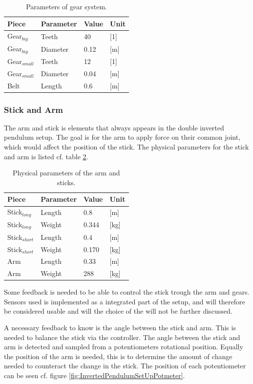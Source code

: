 \begin{table}[htbp]
\centering
\begin{tabular}{llll}
\hline
Piece & Parameter & Value & Unit \\ \hline
Gear$_{big}$ & Teeth & 40 & {[}1{]} \\
Gear$_{big}$ & Diameter & 0.12 & {[}m{]} \\
Gear$_{small}$ & Teeth & 12 & {[}1{]} \\
Gear$_{small}$ & Diameter & 0.04 & {[}m{]} \\
Belt & Length & 0.6 & {[}m{]}
\end{tabular}
\caption{Parameters of gear system.}
\label{GearSystemParameters}
\end{table}

\subsubsection{Stick and Arm}
The arm and stick is elements that always appears in the double inverted pendulum setup. The goal is for the arm to apply force on their common joint, which would affect the position of the stick. The physical parameters for the stick and arm is listed cf. table \ref{DimensionsStick}.

\begin{table}[htbp]
\centering
\begin{tabular}{llll}
\hline
Piece           & Parameter & Value & Unit \\ \hline
Stick$_{long}$  & Length    & 0.8   & [m]    \\
Stick$_{long}$  & Weight    & 0.344 & [kg]    \\ 
Stick$_{short}$ & Length    & 0.4   & [m]    \\
Stick$_{short}$ & Weight    & 0.170 & [kg]    \\ 
Arm             & Length    & 0.33  & [m]    \\
Arm             & Weight    & 288   & [kg]   \\ 
\end{tabular}
\caption{Physical parameters of the arm and sticks.}
\label{DimensionsStick}
\end{table}
\newpage
Some feedback is needed to be able to control the stick trough the arm and gears. Sensors used is implemented as a integrated part of the setup, and will therefore be considered usable and will the choice of the will not be further discussed.

A necessary feedback to know is the angle between the stick and arm. This is needed to balance the stick via the controller. The angle between the stick and arm is detected and sampled from a potentiometers rotational position. Equally the position of the arm is needed, this is to determine the amount of change needed to counteract the change in the stick. The position of each potentiometer can be seen cf. figure \ref{fig:InvertedPendulumSetUpPotmeter}. 

